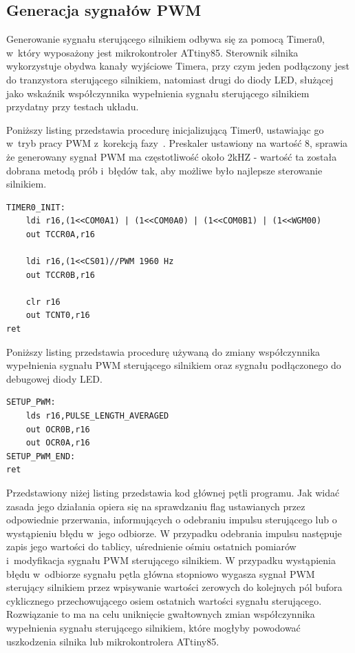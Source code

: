 \subsection{Generacja sygnałów PWM}

Generowanie sygnału sterującego silnikiem odbywa się za pomocą Timera0, w~który wyposażony jest mikrokontroler ATtiny85. Sterownik silnika wykorzystuje obydwa kanały wyjściowe Timera, przy czym jeden podłączony jest do tranzystora sterującego silnikiem, natomiast drugi do diody LED, służącej jako wskaźnik współczynnika wypełnienia sygnału sterującego silnikiem przydatny przy testach układu. 

Poniższy listing przedstawia procedurę inicjalizującą Timer0, ustawiając go w~tryb pracy PWM z~korekcją fazy~\cite{ds_attiny85}. Preskaler ustawiony na wartość 8, sprawia że generowany sygnał PWM ma częstotliwość około 2kHZ - wartość ta została dobrana metodą prób i~błędów tak, aby możliwe było najlepsze sterowanie silnikiem. 

\begin{lstlisting}
TIMER0_INIT:
	ldi r16,(1<<COM0A1) | (1<<COM0A0) | (1<<COM0B1) | (1<<WGM00)
	out TCCR0A,r16

	ldi r16,(1<<CS01)//PWM 1960 Hz
	out TCCR0B,r16

	clr r16
	out TCNT0,r16
ret
\end{lstlisting}


Poniższy listing przedstawia procedurę używaną do zmiany współczynnika wypełnienia sygnału PWM sterującego silnikiem oraz sygnału podłączonego do debugowej diody LED.

\begin{lstlisting}
SETUP_PWM:
	lds r16,PULSE_LENGTH_AVERAGED
	out OCR0B,r16
	out OCR0A,r16
SETUP_PWM_END:
ret
\end{lstlisting}


Przedstawiony niżej listing przedstawia kod głównej pętli programu. Jak widać zasada jego działania opiera się na sprawdzaniu flag ustawianych przez odpowiednie przerwania, informujących o odebraniu impulsu sterującego lub o wystąpieniu błędu w~jego odbiorze. W przypadku odebrania impulsu następuje zapis jego wartości do tablicy, uśrednienie ośmiu ostatnich pomiarów i~modyfikacja sygnału PWM sterującego silnikiem. W przypadku wystąpienia błędu w~odbiorze sygnału pętla główna stopniowo wygasza sygnał PWM sterujący silnikiem przez wpisywanie wartości zerowych do kolejnych pól bufora cyklicznego przechowującego osiem ostatnich wartości sygnału sterującego. Rozwiązanie to ma na celu uniknięcie gwałtownych zmian współczynnika wypełnienia sygnału sterującego silnikiem, które mogłyby powodować uszkodzenia silnika lub mikrokontrolera ATtiny85.

